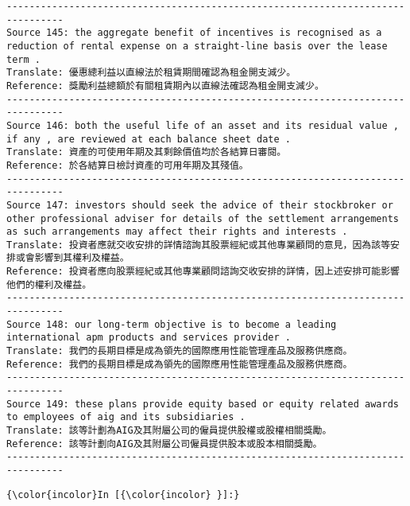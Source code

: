 \documentclass[11pt]{article}
\begin{document}
\begin{Verbatim}[commandchars=\\\{\}]
--------------------------------------------------------------------------------
Source 145: the aggregate benefit of incentives is recognised as a reduction of rental expense on a straight-line basis over the lease term .
Translate: 優惠總利益以直線法於租賃期間確認為租金開支減少。
Reference: 獎勵利益總額於有關租賃期內以直線法確認為租金開支減少。
--------------------------------------------------------------------------------
Source 146: both the useful life of an asset and its residual value , if any , are reviewed at each balance sheet date .
Translate: 資產的可使用年期及其剩餘價值均於各結算日審閱。
Reference: 於各結算日檢討資產的可用年期及其殘值。
--------------------------------------------------------------------------------
Source 147: investors should seek the advice of their stockbroker or other professional adviser for details of the settlement arrangements as such arrangements may affect their rights and interests .
Translate: 投資者應就交收安排的詳情諮詢其股票經紀或其他專業顧問的意見，因為該等安排或會影響到其權利及權益。
Reference: 投資者應向股票經紀或其他專業顧問諮詢交收安排的詳情，因上述安排可能影響他們的權利及權益。
--------------------------------------------------------------------------------
Source 148: our long-term objective is to become a leading international apm products and services provider .
Translate: 我們的長期目標是成為領先的國際應用性能管理產品及服務供應商。
Reference: 我們的長期目標是成為領先的國際應用性能管理產品及服務供應商。
--------------------------------------------------------------------------------
Source 149: these plans provide equity based or equity related awards to employees of aig and its subsidiaries .
Translate: 該等計劃為AIG及其附屬公司的僱員提供股權或股權相關獎勵。
Reference: 該等計劃向AIG及其附屬公司僱員提供股本或股本相關獎勵。
--------------------------------------------------------------------------------

    \end{Verbatim}

    \begin{Verbatim}[commandchars=\\\{\}]
{\color{incolor}In [{\color{incolor} }]:} 
\end{Verbatim}


    
    
    
    
\end{document}
